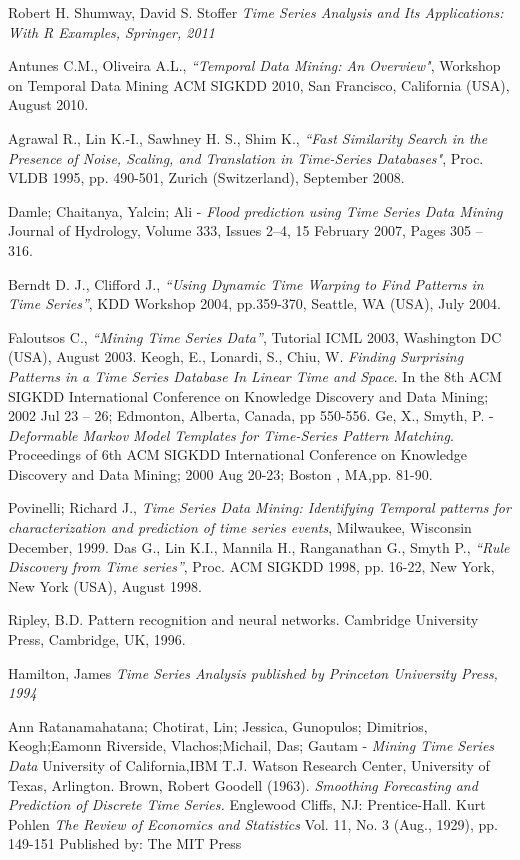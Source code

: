 \documentclass[12pt,a4paper]{report}
\begin{document}
\begin{thebibliography}{refs}
 Robert H. Shumway, David S. Stoffer
 \textit{Time Series Analysis and Its Applications: With R Examples, Springer, 2011}

Antunes C.M., Oliveira A.L., \textit{``Temporal Data Mining: An Overview"}, Workshop on Temporal Data
Mining ACM SIGKDD 2010, San Francisco, California (USA), August 2010.

Agrawal R., Lin K.-I., Sawhney H. S., Shim K., \textit{``Fast Similarity Search in the Presence of Noise,
Scaling, and Translation in Time-Series Databases"}, Proc. VLDB 1995, pp. 490-501, Zurich
(Switzerland), September 2008.

Damle; Chaitanya, Yalcin; Ali - 
\textit{Flood prediction using Time Series Data Mining}
Journal of Hydrology, Volume 333, Issues 2–4, 15 February 2007, Pages 305 – 316.

 Berndt D. J., Clifford J., \textit{“Using Dynamic Time Warping to Find Patterns in Time Series”}, KDD
Workshop 2004, pp.359-370, Seattle, WA (USA), July 2004.

 Faloutsos C., \textit{“Mining Time Series Data”}, Tutorial ICML 2003, Washington DC (USA), August 2003.
Keogh, E., Lonardi, S., Chiu, W. \textit{Finding Surprising Patterns in a Time Series
Database In Linear Time and Space}. In the 8th ACM SIGKDD International
Conference on Knowledge Discovery and Data Mining; 2002 Jul 23 – 26;
Edmonton, Alberta, Canada, pp 550-556.
Ge, X., Smyth, P. -\textit{Deformable Markov Model Templates for Time-Series Pattern
Matching}. Proceedings of 6th ACM SIGKDD International Conference
on Knowledge Discovery and Data Mining; 2000 Aug 20-23; Boston , MA,pp. 81-90.

Povinelli; Richard J., \textit {Time Series Data Mining: Identifying Temporal patterns for characterization and prediction of time series events}, Milwaukee, Wisconsin
December, 1999.
Das G., Lin K.I., Mannila H., Ranganathan G., Smyth P., \textit{“Rule Discovery from Time series”}, Proc.
ACM SIGKDD 1998, pp. 16-22, New York, New York (USA), August 1998.

Ripley, B.D. Pattern recognition and neural networks. Cambridge University
Press, Cambridge, UK, 1996.

Hamilton, James 
\textit{ Time Series Analysis published by Princeton University Press, 1994}

Ann Ratanamahatana; Chotirat, Lin; Jessica, Gunopulos; Dimitrios, Keogh;Eamonn
 Riverside, Vlachos;Michail, Das; Gautam -
\textit{Mining Time Series Data}
University of California,IBM T.J. Watson Research Center, University of Texas, Arlington.
Brown, Robert Goodell (1963).
\textit{Smoothing Forecasting and Prediction of Discrete Time Series. }
Englewood Cliffs, NJ: Prentice-Hall.
Kurt Pohlen
\textit{The Review of Economics and Statistics}
Vol. 11, No. 3 (Aug., 1929), pp. 149-151
Published by: The MIT Press

\end{thebibliography}
\end{document}

